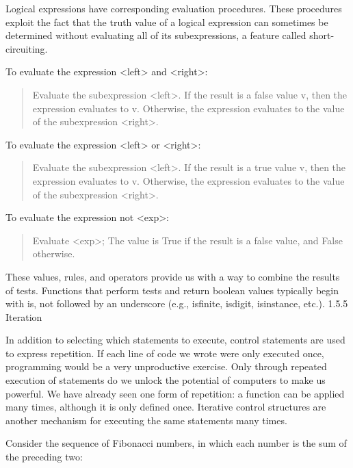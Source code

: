 \documentclass[letterpaper,10pt,dvipdfmx]{sphinxmanual}
\begin{document}
Logical expressions have corresponding evaluation procedures. These procedures exploit the fact that the truth value of a logical expression can sometimes be determined without evaluating all of its subexpressions, a feature called short-circuiting.

To evaluate the expression \textless{}left\textgreater{} and \textless{}right\textgreater{}:
\begin{quote}

Evaluate the subexpression \textless{}left\textgreater{}.
If the result is a false value v, then the expression evaluates to v.
Otherwise, the expression evaluates to the value of the subexpression \textless{}right\textgreater{}.
\end{quote}

To evaluate the expression \textless{}left\textgreater{} or \textless{}right\textgreater{}:
\begin{quote}

Evaluate the subexpression \textless{}left\textgreater{}.
If the result is a true value v, then the expression evaluates to v.
Otherwise, the expression evaluates to the value of the subexpression \textless{}right\textgreater{}.
\end{quote}

To evaluate the expression not \textless{}exp\textgreater{}:
\begin{quote}

Evaluate \textless{}exp\textgreater{}; The value is True if the result is a false value, and False otherwise.
\end{quote}

These values, rules, and operators provide us with a way to combine the results of tests. Functions that perform tests and return boolean values typically begin with is, not followed by an underscore (e.g., isfinite, isdigit, isinstance, etc.).
1.5.5   Iteration

In addition to selecting which statements to execute, control statements are used to express repetition. If each line of code we wrote were only executed once, programming would be a very unproductive exercise. Only through repeated execution of statements do we unlock the potential of computers to make us powerful. We have already seen one form of repetition: a function can be applied many times, although it is only defined once. Iterative control structures are another mechanism for executing the same statements many times.

Consider the sequence of Fibonacci numbers, in which each number is the sum of the preceding two:
\end{document}
